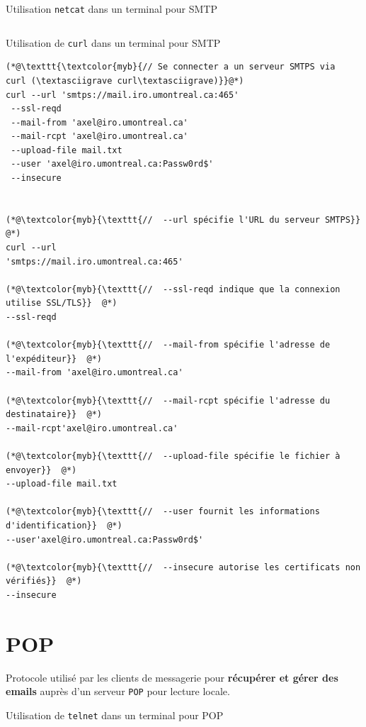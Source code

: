 \documentclass{report}
\begin{document}
\begin{multicols*}{3}
\begin{EExample}{Utilisation \texttt{netcat} dans un terminal  pour SMTP}{}
\begin{lstlisting}
\end{lstlisting}   

\end{EExample}

\begin{EExample}{Utilisation de \texttt{curl} dans un terminal pour SMTP}{}
\begin{lstlisting}
(*@\texttt{\textcolor{myb}{// Se connecter a un serveur SMTPS via  
curl (\textasciigrave curl\textasciigrave)}}@*)
curl --url 'smtps://mail.iro.umontreal.ca:465'
 --ssl-reqd
 --mail-from 'axel@iro.umontreal.ca'
 --mail-rcpt 'axel@iro.umontreal.ca'
 --upload-file mail.txt
 --user 'axel@iro.umontreal.ca:Passw0rd$'
 --insecure


(*@\textcolor{myb}{\texttt{//  --url spécifie l'URL du serveur SMTPS}}  @*)
curl --url   
'smtps://mail.iro.umontreal.ca:465' 

(*@\textcolor{myb}{\texttt{//  --ssl-reqd indique que la connexion utilise SSL/TLS}}  @*)
--ssl-reqd   

(*@\textcolor{myb}{\texttt{//  --mail-from spécifie l'adresse de l'expéditeur}}  @*)
--mail-from 'axel@iro.umontreal.ca' 

(*@\textcolor{myb}{\texttt{//  --mail-rcpt spécifie l'adresse du destinataire}}  @*)
--mail-rcpt'axel@iro.umontreal.ca' 

(*@\textcolor{myb}{\texttt{//  --upload-file spécifie le fichier à envoyer}}  @*)
--upload-file mail.txt   

(*@\textcolor{myb}{\texttt{//  --user fournit les informations d'identification}}  @*)
--user'axel@iro.umontreal.ca:Passw0rd$'

(*@\textcolor{myb}{\texttt{//  --insecure autorise les certificats non vérifiés}}  @*)
--insecure
\end{lstlisting}
\end{EExample}


\section{POP}
\begin{Definitionx}{}{}
    Protocole utilisé par les clients de messagerie pour \textbf{récupérer et gérer des emails} 
    auprès d'un serveur \texttt{POP} pour lecture locale.  
\end{Definitionx}

\begin{EExample}{Utilisation de \texttt{telnet} dans un terminal pour POP}{}


\end{EExample}
\end{multicols*}
\end{document}
